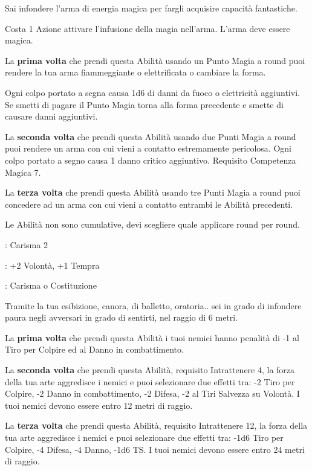\begin{multicols}{2}
Sai infondere l'arma di energia magica per fargli acquisire capacità fantastiche.

Costa 1 Azione attivare l'infusione della magia nell'arma. L'arma deve essere magica.

La \textbf{prima volta} che prendi questa Abilità usando un Punto Magia a round puoi rendere la tua arma fiammeggiante o elettrificata o cambiare la forma.

Ogni colpo portato a segna causa 1d6 di danni da fuoco o elettricità aggiuntivi. Se smetti di pagare il Punto Magia torna alla forma precedente e smette di causare danni aggiuntivi.

La \textbf{seconda volta} che prendi questa Abilità usando due Punti Magia a round puoi rendere un arma con cui vieni a contatto estremamente pericolosa. Ogni colpo portato a segno causa 1 danno critico aggiuntivo. Requisito Competenza Magica 7.

La \textbf{terza volta} che prendi questa Abilità usando tre Punti Magia a round puoi concedere ad un arma con cui vieni a contatto entrambi le Abilità precedenti.

Le Abilità non sono cumulative, devi scegliere quale applicare round per round.

\begin{description}[noitemsep, topsep=0pt, parsep=0pt, partopsep=0pt, leftmargin=0cm, labelwidth=2.5cm]
    \item[\textbf{Requisito}]: Carisma 2
    \item[\textbf{Tiri Salvezza}]: +2 Volontà, +1 Tempra
    \item[\textbf{Caratteristica}]: Carisma o Costituzione
\end{description}

Tramite la tua esibizione, canora, di balletto, oratoria.. sei in grado di infondere paura negli avversari in grado di sentirti, nel raggio di 6 metri.

La \textbf{prima volta} che prendi questa Abilità i tuoi nemici hanno penalità di -1 al Tiro per Colpire ed al Danno in combattimento.

La \textbf{seconda volta} che prendi questa Abilità, requisito Intrattenere 4, la forza della tua arte aggredisce i nemici e puoi selezionare due effetti tra: -2 Tiro per Colpire, -2 Danno in combattimento, -2 Difesa, -2 al Tiri Salvezza su Volontà. I tuoi nemici devono essere entro 12 metri di raggio.

La \textbf{terza volta} che prendi questa Abilità, requisito Intrattenere 12, la forza della tua arte aggredisce i nemici e puoi selezionare due effetti tra: -1d6 Tiro per Colpire, -4 Difesa, -4 Danno, -1d6 TS. I tuoi nemici devono essere entro 24 metri di raggio.


\end{multicols}
